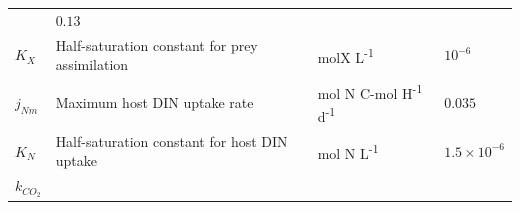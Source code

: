 \documentclass[]{elsarticle} %
\begin{document}
\begin{longtable}[c]{@{}llll@{}}
\begin{minipage}[t]{0.25\columnwidth}
\strut\end{minipage} &
\begin{minipage}[t]{0.12\columnwidth}\raggedright\strut
\(0.13\)
\strut\end{minipage}\tabularnewline
\begin{minipage}[t]{0.10\columnwidth}\raggedright\strut
\(K_X\)
\strut\end{minipage} &
\begin{minipage}[t]{0.45\columnwidth}\raggedright\strut
Half-saturation constant for prey assimilation
\strut\end{minipage} &
\begin{minipage}[t]{0.25\columnwidth}\raggedright\strut
molX L\textsuperscript{-1}
\strut\end{minipage} &
\begin{minipage}[t]{0.12\columnwidth}\raggedright\strut
\(10^{-6}\)
\strut\end{minipage}\tabularnewline
\begin{minipage}[t]{0.10\columnwidth}\raggedright\strut
\(j_{Nm}\)
\strut\end{minipage} &
\begin{minipage}[t]{0.45\columnwidth}\raggedright\strut
Maximum host DIN uptake rate
\strut\end{minipage} &
\begin{minipage}[t]{0.25\columnwidth}\raggedright\strut
mol N C-mol H\textsuperscript{-1} d\textsuperscript{-1}
\strut\end{minipage} &
\begin{minipage}[t]{0.12\columnwidth}\raggedright\strut
\(0.035\)
\strut\end{minipage}\tabularnewline
\begin{minipage}[t]{0.10\columnwidth}\raggedright\strut
\(K_N\)
\strut\end{minipage} &
\begin{minipage}[t]{0.45\columnwidth}\raggedright\strut
Half-saturation constant for host DIN uptake
\strut\end{minipage} &
\begin{minipage}[t]{0.25\columnwidth}\raggedright\strut
mol N L\textsuperscript{-1}
\strut\end{minipage} &
\begin{minipage}[t]{0.12\columnwidth}\raggedright\strut
\(1.5\times 10^{-6}\)
\strut\end{minipage}\tabularnewline
\begin{minipage}[t]{0.10\columnwidth}\raggedright\strut
\(k_{CO_2}\)

\end{minipage}
\end{longtable}
\end{document}
